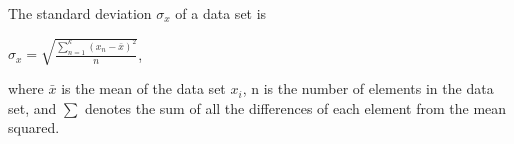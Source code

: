 The standard deviation $ \sigma_x $ of a data set is

$ \sigma_x = \sqrt{\frac{\sum_{n = 1}^{k}(x_n - \bar{x})^2}{n}}$,

where $ \bar{x} $ is the mean of the data set $ x_i $, n is the number of elements in the data set, and $ \sum $ denotes the sum of all the differences of each element from the mean squared.  